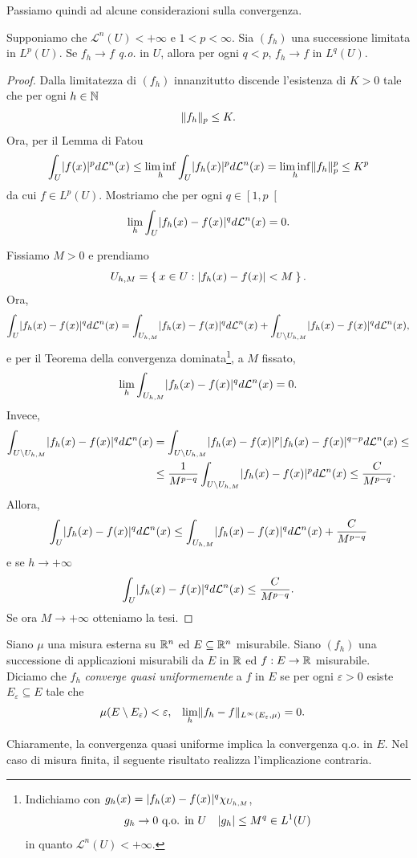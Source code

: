 Passiamo quindi ad alcune considerazioni sulla convergenza.
\begin{proposizione}\label{convergenzaLq}
	Supponiamo che $\mathcal{L}^n(U)< +\infty$ e $1 < p < \infty$.  Sia $(f_{h})$ una successione limitata in $L^p(U)$. Se $f_{h} \to f$ \emph{q.o.} in $U$, allora per ogni $q < p$, $f_{h} \to f$ in $L^q(U)$.
\end{proposizione}
\begin{proof}
	Dalla limitatezza di $(f_{h})$ innanzitutto discende l'esistenza di $K > 0$ tale che per ogni $h \in \mathbb{N}$
	\[ \lVert f_{h}\rVert_{p}\le K. \]
	Ora, per il Lemma di Fatou
	\[ \int_{U}\lvert f(x)\rvert^p d\mathcal{L}^n(x) \le \underset{h}{\liminf} \int_{U} \lvert f_h(x)\rvert^pd\mathcal{L}^n(x) = \underset{h}{\liminf} \lVert f_{h}\rVert_{p}^p \le K^p \]
	da cui $f \in L^p(U)$. Mostriamo che per ogni $q \in \left[  1,p \right[$
	\[ \lim_{h} \int_{U}\lvert f_h(x)-f(x)\rvert^qd\mathcal{L}^n(x) = 0. \]
	
	Fissiamo $M > 0 $ e prendiamo 
	\[ U_{h,M} = \Set{ x \in U: \lvert f_h(x) - f(x)\rvert < M}. \]
	Ora,
	\[ \int_{U}\lvert f_h(x)-f(x)\rvert^qd\mathcal{L}^n(x) =  \int_{U_{h,M}}\lvert f_h(x)-f(x)\rvert^qd\mathcal{L}^n(x) + \int_{U\setminus U_{h,M}}\lvert f_h(x)-f(x)\rvert^qd\mathcal{L}^n(x),\]
	e per il Teorema della convergenza dominata\footnote{Indichiamo con $g_h(x) = \lvert f_h(x)-f(x)\rvert^q\chi_{U_{h,M}}$,
		\begin{align*}
			g_{h} &\to 0 \textup{ q.o. in } U & \lvert g_h\rvert \le M^q \in L^1(U)
		\end{align*} 
		in quanto $\mathcal{L}^n(U) < +\infty$.}, a $M$ fissato,
	\[ \lim_{h} \int_{U_{h,M}}\lvert f_h(x)-f(x)\rvert^qd\mathcal{L}^n(x) = 0.\]
	Invece, 
	\[ \begin{split}
		\int_{U\setminus U_{h,M}}\lvert f_h(x)-f(x)\rvert^qd\mathcal{L}^n(x) &= \int_{U\setminus U_{h,M}}\lvert f_h(x)-f(x)\rvert^p \lvert f_h(x)-f(x)\rvert^{q-p}d\mathcal{L}^n(x) \le \\
		&\le \frac{1}{M^{p-q}}\int_{U\setminus U_{h,M}}\lvert f_h(x)-f(x)\rvert^pd\mathcal{L}^n(x) \le \frac{C}{M^{p-q}}.
	\end{split} \]
	Allora, 
	\[ \int_{U}\lvert f_h(x)-f(x)\rvert^qd\mathcal{L}^n(x) \le \int_{U_{h,M}}\lvert f_h(x)-f(x)\rvert^qd\mathcal{L}^n(x) + \frac{C}{M^{p-q}} \]
	e se $h \to +\infty$
	\[ \int_{U}\lvert f_h(x)-f(x)\rvert^qd\mathcal{L}^n(x) \le \frac{C}{M^{p-q}}. \]
	Se ora $M \to +\infty$ otteniamo la tesi.
\end{proof}

\begin{definizione}
	Siano $\mu$ una misura esterna su $\mathbb{R}^n$ ed $E \subseteq \mathbb{R}^n$ misurabile. Siano $(f_{h})$ una successione di applicazioni misurabili da $E$ in $\mathbb{R}$ ed $f: E \to \mathbb{R}$ misurabile. Diciamo che $f_h$ \emph{converge quasi uniformemente} a $f$ in $E$ se per ogni $\varepsilon>0$ esiste $E_{\varepsilon}\subseteq E$ tale che 
\begin{align*}
	\mu(E\setminus E_{\varepsilon})&< \varepsilon,  & \lim_{h}\lVert f_{h}-f\rVert_{L^{\infty}(E_{\varepsilon},\mu)} &=0.
\end{align*} 
\end{definizione}
Chiaramente, la convergenza quasi uniforme implica la convergenza q.o. in $E$. Nel caso di misura finita, il seguente risultato realizza l'implicazione contraria.

